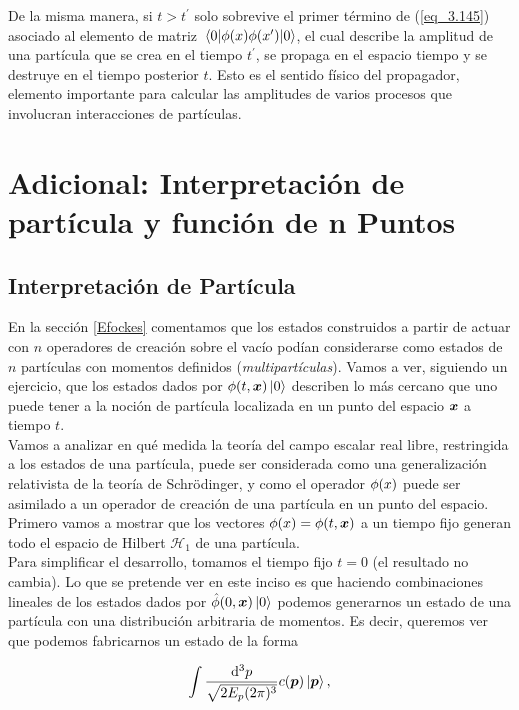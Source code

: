 De la misma manera, si $t > t^\prime $ solo sobrevive el primer término de (\ref{eq_3.145}) asociado al elemento de matriz $\ev{ \Ophi \qty(x) \Ophi \qty(x^\prime)}{0}$, el cual describe la amplitud de una partícula que se crea en el tiempo $t^\prime$, se propaga en el espacio tiempo y se destruye en el tiempo posterior $t$. Esto es el sentido físico del propagador, elemento importante para calcular las amplitudes de varios procesos que involucran interacciones de partículas.

\section{Adicional: Interpretación de partícula y función de n Puntos}

\subsection{Interpretación de Partícula}

En la sección \ref{Efockes} comentamos que los estados construidos a partir de actuar con $n$ operadores de creación sobre el vacío podían considerarse como estados de $n$ partículas con momentos definidos (\emph{multipartículas}). Vamos a ver, siguiendo un ejercicio, que los estados dados por $\phi(t,\vb*{x})\ket{0} $ describen lo más cercano que uno puede tener a la noción de partícula localizada en un punto del espacio $\vb*{x}$ a tiempo $t$.\\

Vamos a analizar en qué medida la teoría del campo escalar real libre, restringida a los estados de una partícula, puede ser considerada como una generalización relativista de la teoría de Schrödinger, y como el operador $\phi(x)$ puede ser asimilado a un operador de creación de una partícula en un punto del espacio. Primero vamos a mostrar que los vectores $\phi(x)=\phi(t,\vb*{x})$ a un tiempo fijo generan todo el espacio de Hilbert $\mathscr{H}_1$ de una partícula.\\

Para simplificar el desarrollo, tomamos el tiempo fijo $t=0$ (el resultado no cambia). Lo que se pretende ver en este inciso es que haciendo combinaciones lineales de los estados dados por $\hat{\phi}(0, \vb*{x})\ket{0}$ podemos generarnos un estado de una partícula con una distribución arbitraria de momentos. Es decir, queremos ver que podemos fabricarnos un estado de la forma

\begin{equation}
    \int \frac{\dd[3]{p}}{\sqrt{2E_p(2 \pi)^3}} c(\vb*{p})\ket{\vb*{p}},
    \label{eq_3.148}
\end{equation}


